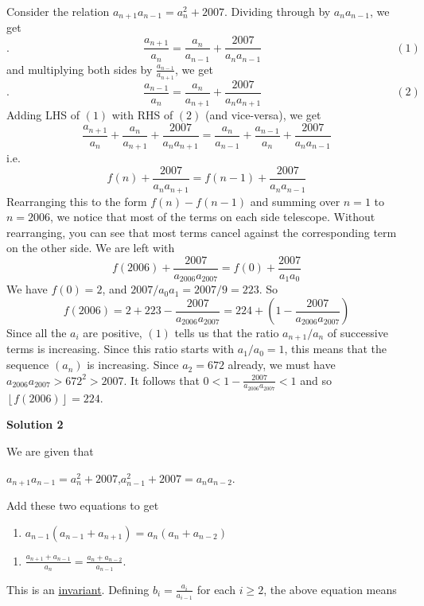 \begin{enumerate}
 Consider the relation $a_{n+1}a_{n-1}=a_{n}^{2}+2007$. Dividing through by $a_{n}a_{n-1}$, we get 
 \[.\phantom{------------} \frac{a_{n+1}}{a_{n}} = \frac{a_{n}}{a_{n-1}} + \frac{2007}{a_{n}a_{n-1}} \phantom{------------} (1)\]and multiplying both sides by $\frac{a_{n-1}}{a_{n+1}}$, we get 
 \[.\phantom{------------} \frac{a_{n-1}}{a_{n}} = \frac{a_{n}}{a_{n+1}} + \frac{2007}{a_{n}a_{n+1}} \phantom{------------} (2)\]Adding LHS of $(1)$ with RHS of $(2)$ (and vice-versa), we get
 \[\frac{a_{n+1}}{a_{n}} + \frac{a_{n}}{a_{n+1}} + \frac{2007}{a_{n}a_{n+1}} = \frac{a_{n}}{a_{n-1}} + \frac{a_{n-1}}{a_{n}} + \frac{2007}{a_{n}a_{n-1}}\]i.e.
 \[f(n)+ \frac{2007}{a_{n}a_{n+1}} = f(n-1) + \frac{2007}{a_{n}a_{n-1}}\]Rearranging this to the form $f(n)-f(n-1)$ and summing over $n=1$ to $n=2006$, we notice that most of the terms on each side telescope. Without rearranging, you can see that most terms cancel against the corresponding term on the other side. We are left with
 \[f(2006) + \frac{2007}{a_{2006}a_{2007}} = f(0) + \frac{2007}{a_{1}a_{0}}\]We have $f(0) = 2$, and $2007/a_0a_1 = 2007/9 = 223$. So
 \[f(2006) = 2 + 223 - \frac{2007}{a_{2006}a_{2007}} = 224 + \left( 1 - \frac{2007}{a_{2006}a_{2007}}\right)\]Since all the $a_i$ are positive, $(1)$ tells us that the ratio $a_{n+1}/a_n$ of successive terms is increasing. Since this ratio starts with $a_1/a_0 = 1$, this means that the sequence $(a_n)$ is increasing. Since $a_2=672$ already, we must have $a_{2006}a_{2007} > 672^2 > 2007$. It follows that $0<1-\frac{2007}{a_{2006}a_{2007}}<1$ and so $\left\lfloor f(2006) \right\rfloor = \boxed{224}$.

 



\textbf{Solution 2}

We are given that

 $a_{n+1}a_{n-1}= a_{n}^{2}+2007$,$a_{n-1}^{2}+2007 = a_{n}a_{n-2}$.

 Add these two equations to get

 
            \begin{enumerate}[label=(\roman*)]
                \item $a_{n-1}(a_{n-1}+a_{n+1}) = a_{n}(a_{n}+a_{n-2})$
            \end{enumerate}
            
            \begin{enumerate}[label=(\roman*)]
                \item $\frac{a_{n+1}+a_{n-1}}{a_{n}}= \frac{a_{n}+a_{n-2}}{a_{n-1}}$.
            \end{enumerate}
            This is an \href{https://artofproblemsolving.com/wiki/index.php?title=Invariant}{invariant}. Defining $b_{i}= \frac{a_{i}}{a_{i-1}}$ for each $i \ge 2$, the above equation means


\end{enumerate}
